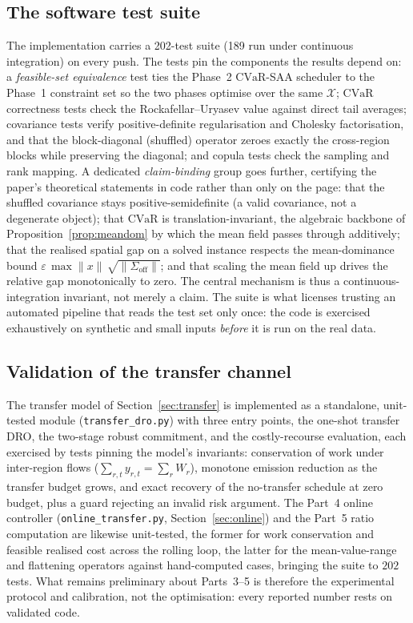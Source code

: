 \documentclass[12pt]{article}
\newcommand{\CVaR}{\mathrm{CVaR}}
\begin{document}
\subsection{The software test suite}\label{sec:testing-suite}
The implementation carries a 202-test suite (189 run under continuous integration) on
every push. The tests pin the components the results depend on: a \emph{feasible-set
equivalence} test ties the Phase~2 $\CVaR$-SAA scheduler to the Phase~1 constraint
set so the two phases optimise over the same $\mathcal X$; $\CVaR$ correctness tests
check the Rockafellar--Uryasev value against direct tail averages; covariance tests
verify positive-definite regularisation and Cholesky factorisation, and that the
block-diagonal (shuffled) operator zeroes exactly the cross-region blocks while
preserving the diagonal; and copula tests check the sampling and rank mapping. A dedicated \emph{claim-binding} group goes further, certifying the paper's theoretical statements in code rather than only on the page: that the shuffled covariance stays positive-semidefinite (a valid covariance, not a degenerate object); that $\CVaR$ is translation-invariant, the algebraic backbone of Proposition~\ref{prop:meandom} by which the mean field passes through additively; that the realised spatial gap on a solved instance respects the mean-dominance bound $\varepsilon\,\max\lVert x\rVert\,\sqrt{\lVert\Sigma_{\mathrm{off}}\rVert}$; and that scaling the mean field up drives the relative gap monotonically to zero. The central mechanism is thus a continuous-integration invariant, not merely a claim. The
suite is what licenses trusting an automated pipeline that reads the test set only
once: the code is exercised exhaustively on synthetic and small inputs \emph{before}
it is run on the real data.

\subsection{Validation of the transfer channel}\label{sec:testing-transfer}
The transfer model of Section~\ref{sec:transfer} is implemented as a standalone,
unit-tested module (\texttt{transfer\_dro.py}) with three entry points, the one-shot
transfer DRO, the two-stage robust commitment, and the costly-recourse evaluation,
each exercised by tests pinning the model's invariants: conservation of work under
inter-region flows ($\sum_{r,t} y_{r,t}=\sum_r W_r$), monotone emission reduction as
the transfer budget grows, and exact recovery of the no-transfer schedule at zero
budget, plus a guard rejecting an invalid risk argument. The Part~4 online controller
(\texttt{online\_transfer.py}, Section~\ref{sec:online}) and the Part~5 ratio
computation are likewise unit-tested, the former for work conservation and feasible
realised cost across the rolling loop, the latter for the mean-value-range and
flattening operators against hand-computed cases, bringing the suite to $202$ tests.
What remains preliminary about Parts~3--5 is therefore the experimental protocol and
calibration, not the optimisation: every reported number rests on validated code.
\end{document}
